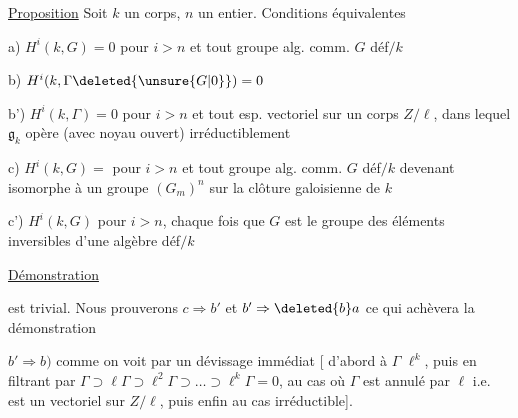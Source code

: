 
\uline{Proposition} Soit $k$ un corps, $n$ un entier. Conditions équivalentes

a) $H^i(k,G)=0$ pour $i>n$ et tout groupe alg. comm. $G$ déf$/k$

b) $H^i(k,\Gamma\deleted{\unsure{G|0}})=0$ 

b') $H^i(k,\Gamma)=0$ pour $i>n$ et tout   esp. vectoriel sur un corps $Z/\ell$, dans lequel $\mathfrak g_k$ opère (avec noyau ouvert) irréductiblement


c) $H^i(k,G)=$ pour $i>n$ et tout groupe alg. comm. $G$ déf$/k$  devenant isomorphe à un groupe  $(G_m)^n$ sur la clôture galoisienne de $k$

c') $H^i(k,G)$  pour $i>n$, chaque fois que $G$ est le groupe des éléments inversibles d'une algèbre    déf$/k$

\uline{Démonstration}


est trivial. Nous prouverons $c\Rightarrow b'$ et $b'\Rightarrow\deleted{b} a$ ce qui achèvera la démonstration

$b'\Rightarrow b)$  comme on voit par un dévissage immédiat [  d'abord à $\Gamma$    $\ell^k$, puis en filtrant par $\Gamma\supset\ell\Gamma\supset\ell^2\Gamma\supset\ldots\supset\ell^k\Gamma=0$, au cas où $\Gamma$ est annulé par $\ell$ i.e. est un vectoriel sur $Z/\ell$, puis enfin au cas irréductible].

